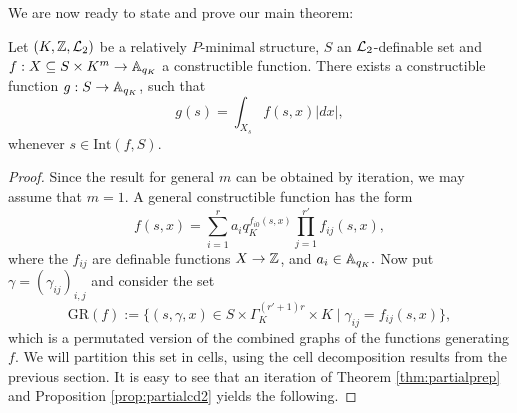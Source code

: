 We are now ready to state and prove our main theorem:
\begin{thm}
Let $(K, \Z, \Lm_2)$ be a relatively $P$-minimal structure, $S$ an $\Lm_2$-definable set and $f: X \subseteq S\times K^m \to \AA_{q_K}$ a constructible function.  There exists a constructible function $g: S \to \AA_{q_K}$, such that
\[g(s) = \int_{X_s} f(s,x)|dx|,\]
whenever $s \in \text{Int}(f,S)$.
\end{thm}
\begin{proof}
Since the result for general $m$ can be obtained by iteration, we may assume that $m =1$. A general constructible function has the form
\[f(s,x) = \sum_{i=1}^r a_i q_K^{f_{i0}(s,x)} \prod_{j=1}^{r'}f_{ij}(s,x),\]
where the $f_{ij}$ are definable functions $X \to \ZZ$, and $a_i \in \AA_{q_K}.$
Now put $\gamma = (\gamma_{ij})_{i,j}$ and consider the set
\[\text{GR}(f):= \{(s,\gamma, x)\in S\times \Gamma_K^{(r'+1)r}\times K \mid  \gamma_{ij} = f_{ij}(s,x)\},\]
which is a permutated version of the combined graphs of the functions generating $f$. We will partition this set in cells, using the cell decomposition results from the previous section. It is easy to see that an iteration of Theorem \ref{thm:partialprep} and Proposition \ref{prop:partialcd2} yields the following.


\end{proof}
